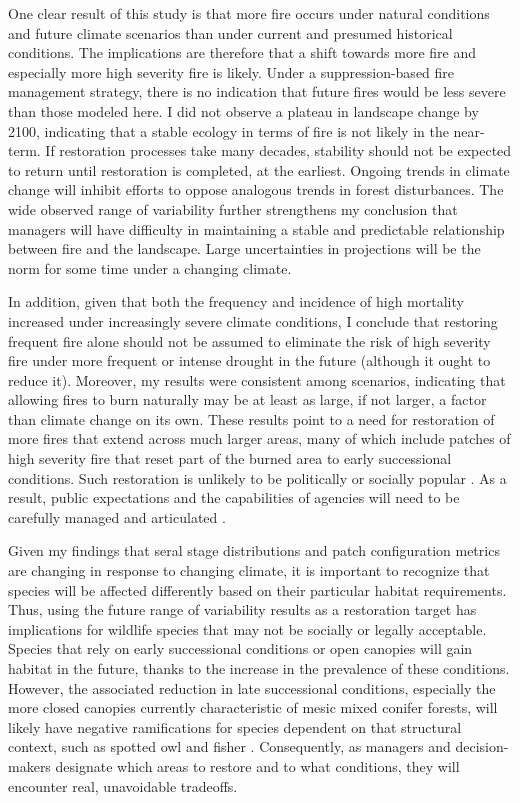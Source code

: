One clear result of this study is that more fire occurs under natural conditions and future climate scenarios than under current and presumed historical conditions. The implications are therefore that a shift towards more fire and especially more high severity fire is likely. Under a suppression-based fire management strategy, there is no indication that future fires would be less severe than those modeled here. I did not observe a plateau in landscape change by 2100, indicating that a stable ecology in terms of fire is not likely in the near-term. If restoration processes take many decades, stability should not be expected to return until restoration is completed, at the earliest. Ongoing trends in climate change will inhibit efforts to oppose analogous trends in forest disturbances. The wide observed range of variability further strengthens my conclusion that managers will have difficulty in maintaining a stable and predictable relationship between fire and the landscape. Large uncertainties in projections will be the norm for some time under a changing climate. 

In addition, given that both the frequency and incidence of high mortality increased under increasingly severe climate conditions, I conclude that restoring frequent fire alone should not be assumed to eliminate the risk of high severity fire under more frequent or intense drought in the future (although it ought to reduce it). Moreover, my results were consistent among scenarios, indicating that allowing fires to burn naturally may be at least as large, if not larger, a factor than climate change on its own. These results point to a need for restoration of more fires that extend across much larger areas, many of which include patches of high severity fire that reset part of the burned area to early successional conditions. Such restoration is unlikely to be politically or socially popular \citep{Stephens2010,Stephens2013}. As a result, public expectations and the capabilities of agencies will need to be carefully managed and articulated \citep{Keeley2000}. 

Given my findings that seral stage distributions and patch configuration metrics are changing in response to changing climate, it is important to recognize that species will be affected differently based on their particular habitat requirements. Thus, using the future range of variability results as a restoration target has implications for wildlife species that may not be socially or legally acceptable. Species that rely on early successional conditions or open canopies will gain habitat in the future, thanks to the increase in the prevalence of these conditions. However, the associated reduction in late successional conditions, especially the more closed canopies currently characteristic of mesic mixed conifer forests, will likely have negative ramifications for species dependent on that structural context, such as spotted owl and fisher \citep{SNEP1996b}. Consequently, as managers and decision-makers designate which areas to restore and to what conditions, they will encounter real, unavoidable tradeoffs.

